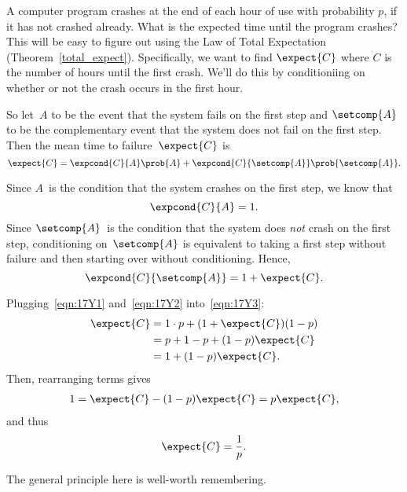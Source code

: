 A computer program crashes at the end of each hour of use with
probability $p$, if it has not crashed already.  What is the expected
time until the program crashes?  This will be easy to figure out using
the  Law of Total Expectation
(Theorem~\ref{total_expect}).  Specifically, we want to find
$\expect{C}$ where $C$ is the number of hours until the first crash.
We'll do this by conditioniing on whether or not the crash occurs in
the first hour.

So let~$A$ to be the event that the system fails on the first step and
$\setcomp{A}$ to be the complementary event that the system does not fail
on the first step.  Then the mean time to failure~$\expect{C}$ is
\begin{equation}\label{eqn:17Y3}
    \expect{C} = \expcond{C}{A} \prob{A} + \expcond{C}{\setcomp{A}} \prob{\setcomp{A}}.
\end{equation}

Since $A$~is the condition that the system crashes on the first
step, we know that
\begin{equation}\label{eqn:17Y1}
    \expcond{C}{A} = 1.
\end{equation}
Since $\setcomp{A}$~is the condition that the system does \emph{not} crash on
the first step, conditioning on~$\setcomp{A}$ is equivalent to taking a first
step without failure and then starting over without conditioning.
Hence,
\begin{equation}\label{eqn:17Y2}
    \expcond{C}{\setcomp{A}} = 1 + \expect{C}.
\end{equation}

Plugging~\eqref{eqn:17Y1} and~\eqref{eqn:17Y2} into~\eqref{eqn:17Y3}:
\begin{align*}
\expect{C}
    &= 1 \cdot p + (1 + \expect{C}) (1 - p) \\
    &= p + 1 - p + (1 - p) \expect{C} \\
    &= 1 + (1 - p) \expect{C}.
\end{align*}
Then, rearranging terms gives
\begin{align*}
    1   = \expect{C} - (1 - p) \expect{C} %
        = p \expect{C},
\end{align*}
and thus
\[
    \expect{C} = \frac{1}{p}.
\]

The general principle here is well-worth remembering.


